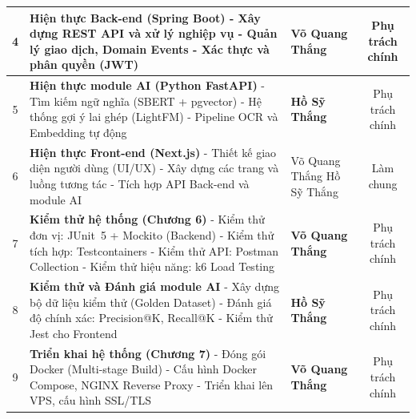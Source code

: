 \begin{center}
\begin{longtable}{|c|p{8.5cm}|p{3cm}|c|}
4 & \textbf{Hiện thực Back-end (Spring Boot)} \newline
- Xây dựng REST API và xử lý nghiệp vụ \newline
- Quản lý giao dịch, Domain Events \newline
- Xác thực và phân quyền (JWT)
& \textbf{Võ Quang Thắng} & Phụ trách chính \\
\hline

5 & \textbf{Hiện thực module AI (Python FastAPI)} \newline
- Tìm kiếm ngữ nghĩa (SBERT + pgvector) \newline
- Hệ thống gợi ý lai ghép (LightFM) \newline
- Pipeline OCR và Embedding tự động
& \textbf{Hồ Sỹ Thắng} & Phụ trách chính \\
\hline

6 & \textbf{Hiện thực Front-end (Next.js)} \newline
- Thiết kế giao diện người dùng (UI/UX) \newline
- Xây dựng các trang và luồng tương tác \newline
- Tích hợp API Back-end và module AI
& Võ Quang Thắng \newline Hồ Sỹ Thắng & Làm chung \\
\hline

7 & \textbf{Kiểm thử hệ thống (Chương 6)} \newline
- Kiểm thử đơn vị: JUnit~5 + Mockito (Backend) \newline
- Kiểm thử tích hợp: Testcontainers \newline
- Kiểm thử API: Postman Collection \newline
- Kiểm thử hiệu năng: k6 Load Testing
& \textbf{Võ Quang Thắng} & Phụ trách chính \\
\hline

8 & \textbf{Kiểm thử và Đánh giá module AI} \newline
- Xây dựng bộ dữ liệu kiểm thử (Golden Dataset) \newline
- Đánh giá độ chính xác: Precision@K, Recall@K \newline
- Kiểm thử Jest cho Frontend
& \textbf{Hồ Sỹ Thắng} & Phụ trách chính \\
\hline

9 & \textbf{Triển khai hệ thống (Chương 7)} \newline
- Đóng gói Docker (Multi-stage Build) \newline
- Cấu hình Docker Compose, NGINX Reverse Proxy \newline
- Triển khai lên VPS, cấu hình SSL/TLS
& \textbf{Võ Quang Thắng} & Phụ trách chính \\
\hline


\end{longtable}
\end{center}
